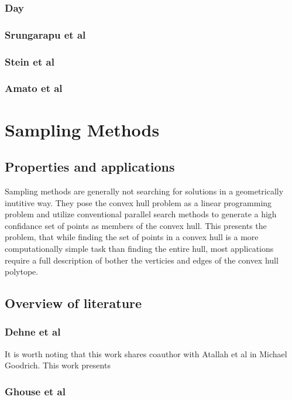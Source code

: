 \documentclass[10pt,a4paper,draft]{report}
\begin{document}
\subsubsection{Day}
\subsubsection{Srungarapu et al}
\subsubsection{Stein et al}



\subsubsection{Amato et al}



\section{Sampling Methods}


\subsection{Properties and applications}
Sampling methods are generally not searching for solutions in a geometrically inutitive way.
They pose the convex hull problem as a linear programming problem and utilize conventional parallel search methods to generate a high confidance set of points as members of the convex hull.
This presents the problem, that while finding the set of points in a convex hull is a more computationally simple task than finding the entire hull, most applications require a full description of bother the verticies and edges of the convex hull polytope.
\subsection{Overview of literature}


\subsubsection{Dehne et al}
It is worth noting that this work shares coauthor with Atallah et al in Michael Goodrich.
This work presents 


\subsubsection{Ghouse et al}


	
\end{document}
